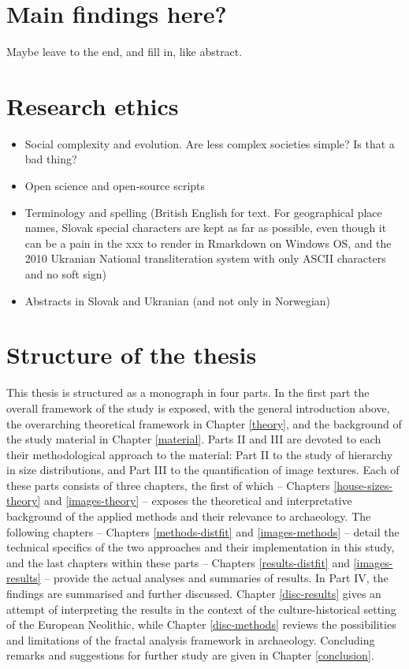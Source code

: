 \documentclass[
  12pt,
]{book}
\begin{document}
\hypertarget{main-findings-here}{%
\section{Main findings here?}\label{main-findings-here}}

Maybe leave to the end, and fill in, like abstract.

\hypertarget{research-ethics}{%
\section{Research ethics}\label{research-ethics}}

\begin{itemize}
\item
  Social complexity and evolution. Are less complex societies simple? Is that a bad thing?
\item
  Open science and open-source scripts
\item
  Terminology and spelling (British English for text. For geographical place names, Slovak special characters are kept as far as possible, even though it can be a pain in the xxx to render in Rmarkdown on Windows OS, and the 2010 Ukranian National transliteration system with only ASCII characters and no soft sign)
\item
  Abstracts in Slovak and Ukranian (and not only in Norwegian)
\end{itemize}

\hypertarget{structure-of-the-thesis}{%
\section{Structure of the thesis}\label{structure-of-the-thesis}}

This thesis is structured as a monograph in four parts. In the first part the overall framework of the study is exposed, with the general introduction above, the overarching theoretical framework in Chapter \ref{theory}, and the background of the study material in Chapter \ref{material}. Parts II and III are devoted to each their methodological approach to the material: Part II to the study of hierarchy in size distributions, and Part III to the quantification of image textures. Each of these parts consists of three chapters, the first of which -- Chapters \ref{house-sizes-theory} and \ref{images-theory} -- exposes the theoretical and interpretative background of the applied methods and their relevance to archaeology. The following chapters -- Chapters \ref{methods-distfit} and \ref{images-methods} -- detail the technical specifics of the two approaches and their implementation in this study, and the last chapters within these parts -- Chapters \ref{results-distfit} and \ref{images-results} -- provide the actual analyses and summaries of results. In Part IV, the findings are summarised and further discussed. Chapter \ref{disc-results} gives an attempt of interpreting the results in the context of the culture-historical setting of the European Neolithic, while Chapter \ref{disc-methods} reviews the possibilities and limitations of the fractal analysis framework in archaeology. Concluding remarks and suggestions for further study are given in Chapter \ref{conclusion}.
\end{document}
